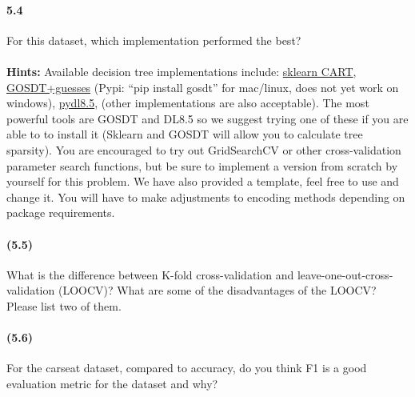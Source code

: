 \documentclass{exam}
\begin{document}
\paragraph{5.4} For this dataset, which implementation performed the best?

\paragraph {}
\textbf{Hints:} Available decision tree implementations include:
\href{https://scikit-learn.org/stable/modules/tree.html}{sklearn CART}, \href{https://github.com/chudizhong/gosdt-guesses} {GOSDT+guesses} (Pypi: ``pip install gosdt'' for mac/linux, does not yet work on windows), \href{https://github.com/aia-uclouvain/pydl8.5}{pydl8.5}, (other implementations are also acceptable). The most powerful tools are GOSDT and DL8.5 so we suggest trying one of these if you are able to to install it (Sklearn and GOSDT will allow you to calculate tree sparsity). You are encouraged to try out GridSearchCV or other cross-validation parameter search functions, but be sure to implement a version from scratch by yourself for this problem. We have also provided a template, feel free to use and change it. You will have to make adjustments to encoding methods depending on package requirements. 

\paragraph{(5.5)} What is the difference between K-fold cross-validation and leave-one-out-cross-validation (LOOCV)? What are some of the disadvantages of the LOOCV? Please list two of them.

\paragraph{(5.6)} For the carseat dataset, compared to accuracy, do you think F1 is a good evaluation metric for the dataset and why?
\end{document}
